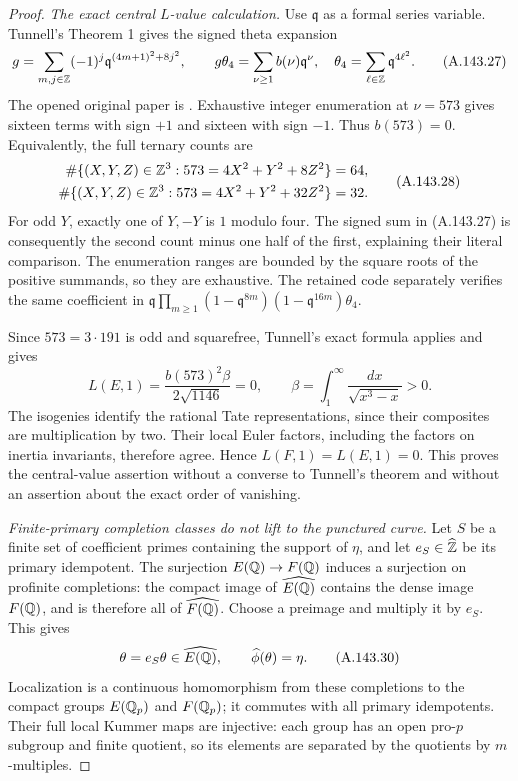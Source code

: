 \begin{proof}
\emph{The exact central \(L\)-value calculation.}
Use \(\mathfrak q\) as a formal series variable.
Tunnell's Theorem 1 gives the signed theta expansion
\[
 g=\sum_{m,j\in\mathbb Z}(-1)^j
                 \mathfrak q^{(4m+1)^2+8j^2},
      \qquad
 g\theta_4=\sum_{\nu\ge1}b(\nu)\mathfrak q^\nu,
      \quad \theta_4=\sum_{\ell\in\mathbb Z}\mathfrak q^{4\ell^2}.
\tag{A.143.27}
\]
The opened original paper is
\cite[Theorem 1, p.~326; Theorem 3, pp.~328--329]{LegTunnell1983}.
Exhaustive integer enumeration at \(\nu=573\) gives sixteen
terms with sign \(+1\) and sixteen with sign \(-1\).
Thus \(b(573)=0\).
Equivalently, the full ternary counts are
\[
 \begin{aligned}
 \#\{(X,Y,Z)\in\mathbb Z^3:573=4X^2+Y^2+8Z^2\}&=64,\\
 \#\{(X,Y,Z)\in\mathbb Z^3:573=4X^2+Y^2+32Z^2\}&=32.
 \end{aligned}
\tag{A.143.28}
\]
For odd \(Y\), exactly one of \(Y,-Y\) is \(1\) modulo four.
The signed sum in (A.143.27) is consequently the second count
minus one half of the first, explaining their literal comparison.
The enumeration ranges are bounded by the square roots of the
positive summands, so they are exhaustive.
The retained code separately verifies the same coefficient in
\(\mathfrak q\prod_{m\ge1}(1-\mathfrak q^{8m})
(1-\mathfrak q^{16m})\theta_4\).

Since \(573=3\cdot191\) is odd and squarefree, Tunnell's exact
formula applies and gives
\[
 L(E,1)=\frac{b(573)^2\beta}{2\sqrt{1146}}=0,\qquad
       \beta=\int_1^\infty\frac{dx}{\sqrt{x^3-x}}>0 .
\tag{A.143.29}
\]
The isogenies identify the rational Tate representations, since
their composites are multiplication by two.  Their local Euler
factors, including the factors on inertia invariants, therefore
agree.  Hence \(L(F,1)=L(E,1)=0\).
This proves the central-value assertion without a converse to
Tunnell's theorem and without an assertion about the exact order
of vanishing.

\emph{Finite-primary completion classes do not lift to the punctured curve.}
Let \(S\) be a finite set of coefficient primes containing the
support of \(\eta\), and let \(e_S\in\widehat{\mathbb Z}\) be its
primary idempotent.
The surjection \(E(\mathbb Q)\to F(\mathbb Q)\) induces a surjection on
profinite completions: the compact image of
\(\widehat{E(\mathbb Q)}\) contains the dense image \(F(\mathbb Q)\), and is
therefore all of \(\widehat{F(\mathbb Q)}\).
Choose a preimage and multiply it by \(e_S\).
This gives
\[
              \theta=e_S\theta\in\widehat{E(\mathbb Q)},\qquad
                                \widehat\phi(\theta)=\eta.
\tag{A.143.30}
\]
Localization is a continuous homomorphism from these completions
to the compact groups \(E(\mathbb Q_p)\) and \(F(\mathbb Q_p)\);
it commutes with all primary idempotents.
Their full local Kummer maps are injective: each group has an
open pro-\(p\) subgroup and finite quotient, so its elements are
separated by the quotients by \(m\)-multiples.


\end{proof}
